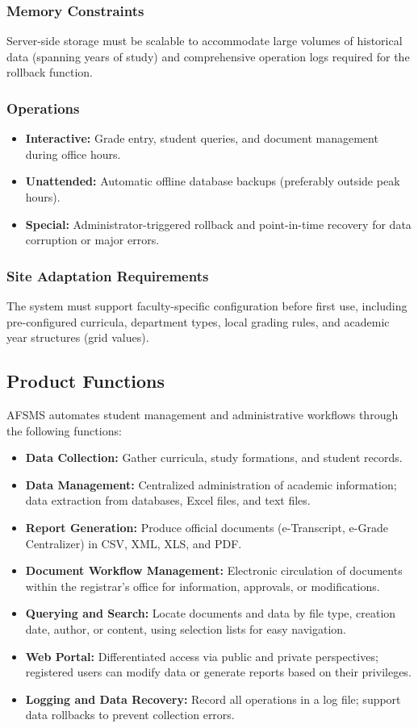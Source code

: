 \documentclass[11pt, a4paper]{article}
\begin{document}
\subsubsection{Memory Constraints}
Server-side storage must be scalable to accommodate large volumes of historical data (spanning years of study) and comprehensive operation logs required for the rollback function.

\subsubsection{Operations}
\begin{itemize}
    \item \textbf{Interactive:} Grade entry, student queries, and document management during office hours.
    \item \textbf{Unattended:} Automatic offline database backups (preferably outside peak hours).
    \item \textbf{Special:} Administrator-triggered rollback and point-in-time recovery for data corruption or major errors.
\end{itemize}

\subsubsection{Site Adaptation Requirements}
The system must support faculty-specific configuration before first use, including pre-configured curricula, department types, local grading rules, and academic year structures (grid values).

\subsection{Product Functions}
AFSMS automates student management and administrative workflows through the following functions:
\begin{itemize}
    \item \textbf{Data Collection:} Gather curricula, study formations, and student records.
    \item \textbf{Data Management:} Centralized administration of academic information; data extraction from databases, Excel files, and text files.
    \item \textbf{Report Generation:} Produce official documents (e-Transcript, e-Grade Centralizer) in CSV, XML, XLS, and PDF.
    \item \textbf{Document Workflow Management:} Electronic circulation of documents within the registrar's office for information, approvals, or modifications.
    \item \textbf{Querying and Search:} Locate documents and data by file type, creation date, author, or content, using selection lists for easy navigation.
    \item \textbf{Web Portal:} Differentiated access via public and private perspectives; registered users can modify data or generate reports based on their privileges.
    \item \textbf{Logging and Data Recovery:} Record all operations in a log file; support data rollbacks to prevent collection errors.
\end{itemize}
\end{document}
